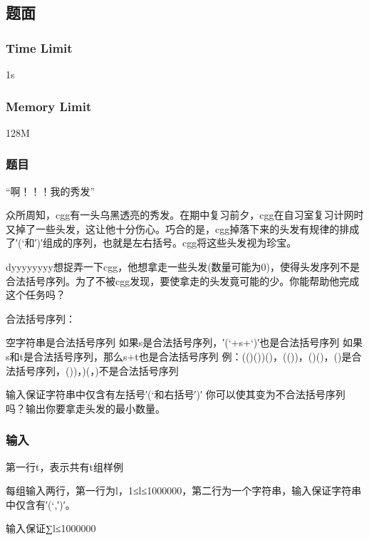 \subsection{题面}

\subsubsection{Time Limit}
1s

\subsubsection{Memory Limit}
128M

\subsubsection{题目}
“啊！！！我的秀发”

众所周知，cgg有一头乌黑透亮的秀发。在期中复习前夕，cgg在自习室复习计网时又掉了一些头发，这让他十分伤心。巧合的是，cgg掉落下来的头发有规律的排成了′(‘和′)′组成的序列，也就是左右括号。cgg将这些头发视为珍宝。

dyyyyyyyy想捉弄一下cgg，他想拿走一些头发(数量可能为0)，使得头发序列不是合法括号序列。为了不被cgg发现，要使拿走的头发竟可能的少。你能帮助他完成这个任务吗？

合法括号序列：

空字符串是合法括号序列
如果s是合法括号序列，′(‘+s+‘)′也是合法括号序列
如果s和t是合法括号序列，那么s+t也是合法括号序列
例：(()())()，(())，()()，()是合法括号序列，())，)(，)不是合法括号序列

输入保证字符串中仅含有左括号′(‘和右括号′)′
你可以使其变为不合法括号序列吗？输出你要拿走头发的最小数量。

\subsubsection{输入}
第一行t，表示共有t组样例

每组输入两行，第一行为l，1≤l≤1000000，第二行为一个字符串，输入保证字符串中仅含有′(‘,′)′。

输入保证∑l≤1000000

